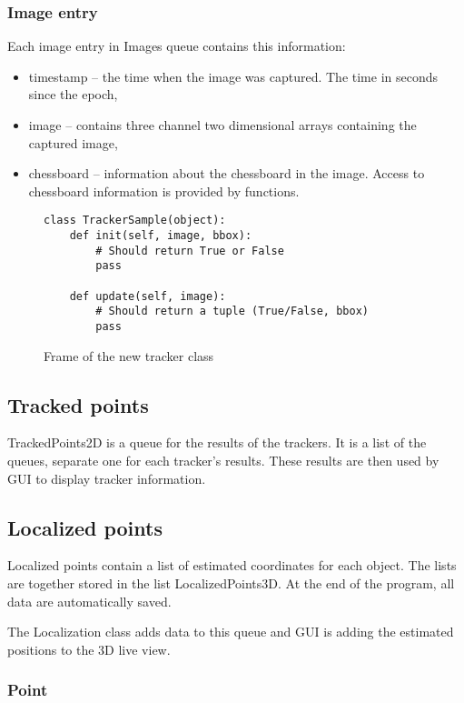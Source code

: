 \subsubsection*{Image entry}

Each image entry in Images queue contains this information: 
\begin{itemize}
\item timestamp -- the time when the image was captured. The time in seconds
since the epoch, \item image -- contains three channel two dimensional arrays
containing the captured image, \item chessboard -- information about the
chessboard in the image. Access to chessboard information is provided by
functions. 
\end{itemize}

\begin{figure}
\begin{verbatim}
class TrackerSample(object):
    def init(self, image, bbox):
        # Should return True or False
        pass
    
    def update(self, image):
        # Should return a tuple (True/False, bbox)
        pass
\end{verbatim}
\caption{Frame of the new tracker class}
\label{fig:new-tracker}
\end{figure}

\subsection*{Tracked points}

TrackedPoints2D is a queue for the results of the trackers. It is a list of the
queues, separate one for each tracker's results. These results are then used by
GUI to display tracker information.

\subsection*{Localized points}

Localized points contain a list of estimated coordinates for each object. The
lists are together stored in the list LocalizedPoints3D. At the end of the
program, all data are automatically saved.

The Localization class adds data to this queue and GUI is adding the estimated
positions to the 3D live view.

\subsubsection*{Point}

